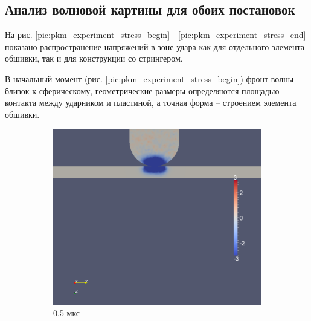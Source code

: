 \clearpage
\newpage

\subsection{Анализ волновой картины для обоих постановок}

На рис. \ref{pic:pkm_experiment_stress_begin} - \ref{pic:pkm_experiment_stress_end} показано распространение напряжений в зоне удара как для отдельного элемента обшивки, так и для конструкции со стрингером.

В начальный момент (рис. \ref{pic:pkm_experiment_stress_begin}) фронт волны близок к сферическому, геометрические размеры определяются площадью контакта между ударником и пластиной, а точная форма -- строением элемента обшивки.

\begin{figure}[H]
\begin{subfigure}[b]{0.5\textwidth}
\centering
\includegraphics[width=\textwidth]{png/pkm-experiment/wing-only/wave/syy-0001.png}
\caption{0.5 мкс}
\end{subfigure}
\begin{subfigure}[b]{0.5\textwidth}
\centering

\end{subfigure}
\end{figure}
